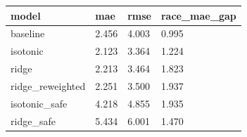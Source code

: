 \begin{tabular}{llll}
\toprule
model & mae & rmse & race\_mae\_gap \\
\midrule
baseline & 2.456 & 4.003 & 0.995 \\
isotonic & 2.123 & 3.364 & 1.224 \\
ridge & 2.213 & 3.464 & 1.823 \\
ridge_reweighted & 2.251 & 3.500 & 1.937 \\
isotonic_safe & 4.218 & 4.855 & 1.935 \\
ridge_safe & 5.434 & 6.001 & 1.470 \\
\bottomrule
\end{tabular}
